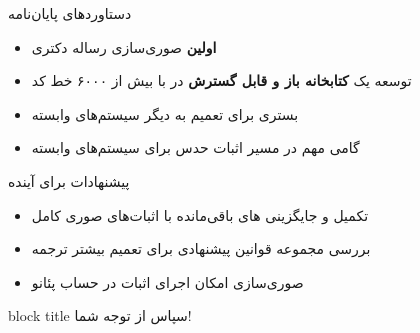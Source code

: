\documentclass[12pt, aspectratio=169]{beamer}
\begin{document}
\begin{frame}{دستاوردهای پایان‌نامه}

\begin{itemize}
  \item \textbf{اولین} صوری‌سازی رساله دکتری 
  \item توسعه یک \textbf{کتابخانه باز و قابل گسترش} در  با بیش از ۶۰۰۰ خط کد
  \item بستری برای تعمیم به دیگر سیستم‌های وابسته
  \item گامی مهم در مسیر اثبات حدس  برای سیستم‌های وابسته
\end{itemize}

\end{frame}

\begin{frame}{پیشنهادات برای آینده}

\begin{itemize}
  \item تکمیل و جایگزینی های باقی‌مانده با اثبات‌های صوری کامل
  \item بررسی مجموعه قوانین پیشنهادی  برای تعمیم بیشتر ترجمه
  \item صوری‌سازی امکان اجرای اثبات در حساب پئانو
\end{itemize}

\end{frame}

{
\begin{frame}
  \centering
  \vspace*{1.5cm}
 
  \begin{beamercolorbox}[wd=0.9\paperwidth,center,sep=12pt,rounded=true,shadow=true]{block title}
    {\huge سپاس از توجه شما!}
  \end{beamercolorbox}
 
  \vspace{1.2cm}
\end{frame}
}
\end{document}
